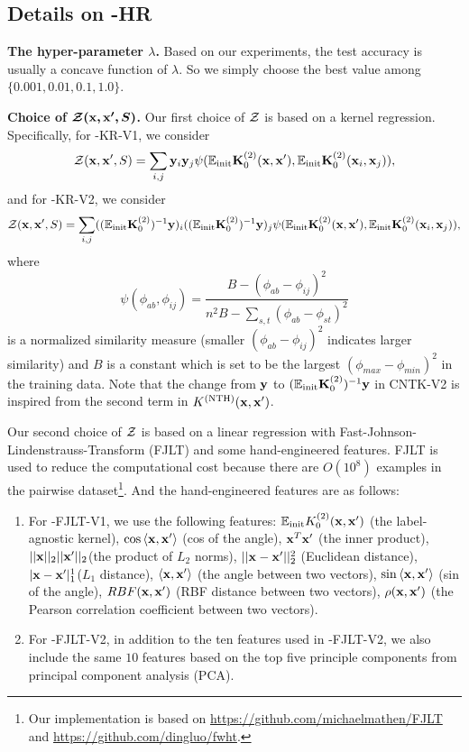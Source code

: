 \subsection{Details on \lantk-HR}\label{subsec:details-of-Z}
{\bf The hyper-parameter $\lambda$.} Based on our experiments, the test accuracy is usually a concave function of $\lambda$. So we simply choose the best value among $\{0.001, 0.01, 0.1, 1.0\}$.

{\bf Choice of $\boldsymbol{{\mathcal{Z}}({\mathbf{x}}, {\mathbf{x}}', S)}$.} Our first choice of ${\mathcal{Z}}$ is based on a kernel regression. Specifically, for \lantk-KR-V1, we consider 
\[
{\mathcal{Z}}({\mathbf{x}}, {\mathbf{x}}', S) = \sum_{i,j} {\mathbf{y}}_i{\mathbf{y}}_j \psi({\mathbb{E}}_{\textnormal{init}} {\mathbf{K}}_0^{(2)}({\mathbf{x}}, {\mathbf{x}}'), {\mathbb{E}}_{\textnormal{init}} {\mathbf{K}}_0^{(2)}({\mathbf{x}}_i, {\mathbf{x}}_j)),
\]
and for \lantk-KR-V2, we consider 
\[
{\mathcal{Z}}({\mathbf{x}}, {\mathbf{x}}', S) = \sum_{i,j} ((\mathbb{E}_{\textnormal{init}}{{\mathbf{K}}}^{(2)}_0)^{-1}{\mathbf{y}})_i((\mathbb{E}_{\textnormal{init}}{{\mathbf{K}}}^{(2)}_0)^{-1}{\mathbf{y}})_j \psi({\mathbb{E}}_{\textnormal{init}} {\mathbf{K}}_0^{(2)}({\mathbf{x}}, {\mathbf{x}}'), {\mathbb{E}}_{\textnormal{init}} {\mathbf{K}}_0^{(2)}({\mathbf{x}}_i, {\mathbf{x}}_j)),
\]
where 
\[
\psi(\phi_{ab}, \phi_{ij}) = \frac{B - (\phi_{ab} - \phi_{ij})^2}{n^2B - \sum_{s,t}(\phi_{ab} - \phi_{st})^2}
\] 
is a normalized similarity measure (smaller $(\phi_{ab} - \phi_{ij})^2$ indicates larger similarity) and $B$ is a constant which is set to be the largest $(\phi_{max} - \phi_{min})^2$ in the training data. Note that the change from ${\mathbf{y}}$ to $(\mathbb{E}_{\textnormal{init}}{{\mathbf{K}}}^{(2)}_0)^{-1}{\mathbf{y}}$ in CNTK-V2 is inspired from the second term in $K^{(\textnormal{NTH})}({\mathbf{x}}, {\mathbf{x}}')$. 

Our second choice of ${\mathcal{Z}}$ is based on a linear regression with Fast-Johnson-Lindenstrauss-Transform (FJLT) \citep{ailon2009fast} and some hand-engineered features. FJLT is used to reduce the computational cost because there are $O(10^8)$ examples in the pairwise dataset\footnote{Our implementation is based on \url{https://github.com/michaelmathen/FJLT} and \url{https://github.com/dingluo/fwht}.}. And the hand-engineered features are as follows:
\begin{enumerate}
    \item For \lantk-FJLT-V1, we use the following features: ${\mathbb{E}}_{\textnormal{init}}{K}^{(2)}_0({\mathbf{x}}, {\mathbf{x}}')$ (the label-agnostic kernel), $\cos\left<{\mathbf{x}}, {\mathbf{x}}'\right>$ (cos of the angle), ${\mathbf{x}}^T{\mathbf{x}}'$ (the inner product), $||{\mathbf{x}}||_2||{\mathbf{x}}'||_2$(the product of $L_2$ norms), $||{\mathbf{x}} - {\mathbf{x}}'||_2^2$ (Euclidean distance), $|{\mathbf{x}} - {\mathbf{x}}'|_1^1$($L_1$ distance), $\left<{\mathbf{x}}, {\mathbf{x}}'\right>$ (the angle between two vectors), $\sin\left<{\mathbf{x}}, {\mathbf{x}}'\right>$ (sin of the angle), $RBF({\mathbf{x}}, {\mathbf{x}}')$ (RBF distance between two vectors), $\rho({\mathbf{x}}, {\mathbf{x}}')$ (the Pearson correlation coefficient between two vectors). 
    \item For \lantk-FJLT-V2, in addition to the ten features used in \lantk-FJLT-V2, we also include the same $10$ features based on the top five principle components from principal component analysis (PCA).
\end{enumerate}

